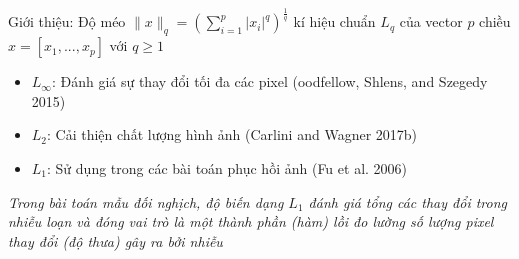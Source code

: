 \begin{frame}{Giới thiệu: Độ méo}
    $\lVert x \rVert_q = \left( \sum_{i=1}^p |x_i|^q \right)^{\frac{1}{q}}$ kí hiệu chuẩn $L_q$
    của vector $p$ chiều $x = [x_1, ..., x_p]$ với $q \geq 1$ 
    
    \begin{itemize}
        \item $L_{\infty}$: Đánh giá sự thay đổi tối đa các pixel (oodfellow, Shlens, and Szegedy 2015)
        \item $L_2$: Cải thiện chất lượng hình ảnh (Carlini and Wagner 2017b)
        \item $L_1$: Sử dụng trong các bài toán phục hồi ảnh (Fu et al. 2006)
    \end{itemize}

    \textit{Trong bài toán mẫu đối nghịch, độ biến dạng $L_1$ đánh giá tổng các thay đổi trong nhiễu loạn và đóng vai trò là một thành phần
    (hàm) lồi đo lường số lượng pixel thay đổi (độ thưa) gây ra bởi nhiễu}
\end{frame}

\begin{frame}{}
    
\end{frame}